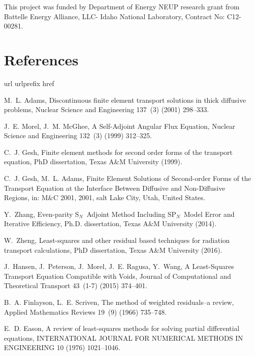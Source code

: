 \documentclass[review]{elsarticle}
\begin{document}
This project was funded by Department of Energy NEUP research grant from Battelle Energy Alliance, LLC- Idaho National Laboratory, Contract No: C12-00281.
\section*{References}
%
\begin{thebibliography}{10}
	\expandafter\ifx\csname url\endcsname\relax
	\def\url#1{\texttt{#1}}\fi
	\expandafter\ifx\csname urlprefix\endcsname\relax\def\urlprefix{URL }\fi
	\expandafter\ifx\csname href\endcsname\relax
	\def\href#1#2{#2} \def\path#1{#1}\fi
	
	M.~L. Adams, Discontinuous finite element transport solutions in thick
	diffusive problems, Nuclear Science and Engineering 137~(3) (2001) 298--333.
	
	J.~E. Morel, J.~M. McGhee, {A Self-Adjoint Angular Flux Equation}, Nuclear
	Science and Engineering 132~(3) (1999) 312--325.
	
	C.~J. Gesh, Finite element methods for second order forms of the transport
	equation, {PhD} dissertation, Texas A\&M University (1999).
	
	C.~J. Gesh, M.~L. Adams, {Finite Element Solutions of Second-order Forms of the
		Transport Equation at the Interface Between Diffusive and Non-Diffusive
		Regions}, in: M\&C 2001, 2001, salt Lake City, Utah, United States.
	
	Y.~Zhang, {Even-parity S$_N$\ Adjoint Method Including SP$_N$\ Model Error and
		Iterative Efficiency}, Ph.D. dissertation, Texas A\&M University (2014).
	
	W.~Zheng, Least-squares and other residual based techniques for radiation
	transport calculations, {PhD} dissertation, Texas A\&M University (2016).
	
	J.~Hansen, J.~Peterson, J.~Morel, J.~E. Ragusa, Y.~Wang, {A Least-Squares
		Transport Equation Compatible with Voids}, Journal of Computational and
	Theoretical Transport 43~(1-7) (2015) 374--401.
	
	B.~A. Finlayson, L.~E. Scriven, The method of weighted residuals--a review,
	Applied Mathematics Reviews 19~(9) (1966) 735--748.
	
	E.~D. Eason, A review of least-squares methods for solving partial differential
	equations, INTERNATIONAL JOURNAL FOR NUMERICAL METHODS IN ENGINEERING 10
	(1976) 1021--1046.
	

\end{thebibliography}
\end{document}
